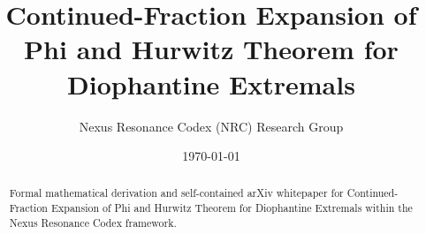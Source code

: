 \documentclass[11pt,a4paper]{article}
\title{Continued-Fraction Expansion of Phi and Hurwitz Theorem for Diophantine Extremals}
\author{Nexus Resonance Codex (NRC) Research Group}
\date{\today}
\begin{document}
\maketitle

\begin{abstract}
Formal mathematical derivation and self-contained arXiv whitepaper for Continued-Fraction Expansion of Phi and Hurwitz Theorem for Diophantine Extremals within the Nexus Resonance Codex framework.
\end{abstract}





\end{document}
